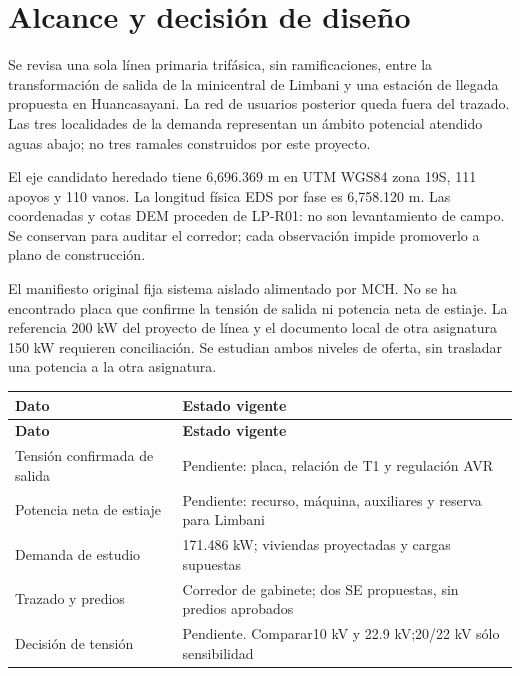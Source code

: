 \setcounter{section}{0}
\section{Alcance y decisión de diseño}
Se revisa una sola línea primaria trifásica, sin ramificaciones, entre la transformación de salida de la minicentral de Limbani y una estación de llegada propuesta en Huancasayani. La red de usuarios posterior queda fuera del trazado. Las tres localidades de la demanda representan un ámbito potencial atendido aguas abajo; no tres ramales construidos por este proyecto.

El eje candidato heredado tiene 6,696.369 m en UTM WGS84 zona 19S, 111 apoyos y 110 vanos. La longitud física EDS por fase es 6,758.120 m. Las coordenadas y cotas DEM proceden de LP-R01: no son levantamiento de campo. Se conservan para auditar el corredor; cada observación impide promoverlo a plano de construcción.

El manifiesto original fija sistema aislado alimentado por MCH. No se ha encontrado placa que confirme la tensión de salida ni potencia neta de estiaje. La referencia 200 kW del proyecto de línea y el documento local de otra asignatura 150 kW requieren conciliación. Se estudian ambos niveles de oferta, sin trasladar una potencia a la otra asignatura.

\begingroup\small\setlength{\LTpre}{4pt}\setlength{\LTpost}{6pt}
\begin{longtable}{*{2}{L{\dimexpr\linewidth/2-2\tabcolsep\relax}}}
\toprule
\textbf{Dato} & \textbf{Estado vigente} \\ \midrule
\endfirsthead
\toprule
\textbf{Dato} & \textbf{Estado vigente} \\ \midrule
\endhead
Tensión confirmada de salida & Pendiente: placa, relación de T1 y regulación AVR \\
Potencia neta de estiaje & Pendiente: recurso, máquina, auxiliares y reserva para Limbani \\
Demanda de estudio & 171.486 kW; viviendas proyectadas y cargas supuestas \\
Trazado y predios & Corredor de gabinete; dos SE propuestas, sin predios aprobados \\
Decisión de tensión & Pendiente. Comparar10 kV y 22.9 kV;20/22 kV sólo sensibilidad \\
\bottomrule\end{longtable}\endgroup


